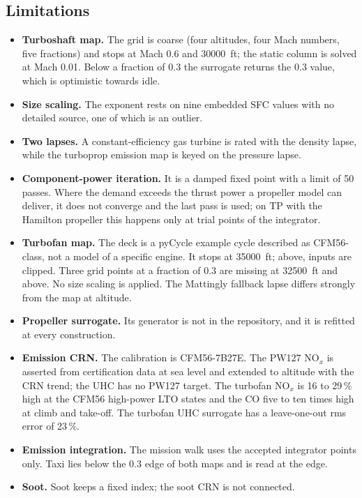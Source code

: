 \documentclass[a4paper,11pt]{article}
\begin{document}
\subsection{Limitations}
\begin{itemize}
\item \textbf{Turboshaft map.} The grid is coarse (four altitudes, four Mach numbers, five
  fractions) and stops at Mach 0.6 and \SI{30000}{ft}; the static column is solved at Mach 0.01.
  Below a fraction of 0.3 the surrogate returns the 0.3 value, which is optimistic towards idle.
\item \textbf{Size scaling.} The exponent rests on nine embedded SFC values with no detailed
  source, one of which is an outlier.
\item \textbf{Two lapses.} A constant-efficiency gas turbine is rated with the density lapse,
  while the turboprop emission map is keyed on the pressure lapse.
\item \textbf{Component-power iteration.} It is a damped fixed point with a limit of 50 passes.
  Where the demand exceeds the thrust power a propeller model can deliver, it does not converge
  and the last pass is used; on TP with the Hamilton propeller this happens only at trial points
  of the integrator.
\item \textbf{Turbofan map.} The deck is a pyCycle example cycle described as CFM56-class, not a
  model of a specific engine. It stops at \SI{35000}{ft}; above, inputs are clipped. Three grid
  points at a fraction of 0.3 are missing at \SI{32500}{ft} and above. No size scaling is
  applied. The Mattingly fallback lapse differs strongly from the map at altitude.
\item \textbf{Propeller surrogate.} Its generator is not in the repository, and it is refitted at
  every construction.
\item \textbf{Emission CRN.} The calibration is CFM56-7B27E. The PW127 NO$_x$ is asserted from
  certification data at sea level and extended to altitude with the CRN trend; the UHC has no
  PW127 target. The turbofan NO$_x$ is 16 to 29\,\% high at the CFM56 high-power LTO states and
  the CO five to ten times high at climb and take-off. The turbofan UHC surrogate has a
  leave-one-out rms error of 23\,\%.
\item \textbf{Emission integration.} The mission walk uses the accepted integrator points only.
  Taxi lies below the 0.3 edge of both maps and is read at the edge.
\item \textbf{Soot.} Soot keeps a fixed index; the soot CRN is not connected.
\end{itemize}
\end{document}
